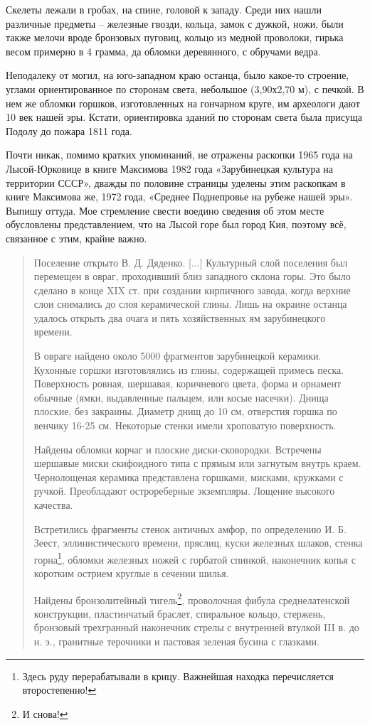 Скелеты лежали в гробах, на спине, головой к западу. Среди них нашли различные предметы – железные гвозди, кольца, замок с дужкой, ножи, были также мелочи вроде бронзовых пуговиц, кольцо из медной проволоки, гирька весом примерно в 4 грамма, да обломки деревянного, с обручами ведра. 

Неподалеку от могил, на юго-западном краю останца, было какое-то строение, углами ориентированное по сторонам света, небольшое (3,90х2,70 м), с печкой. В нем же обломки горшков, изготовленных на гончарном круге, им археологи дают 10 век нашей эры. Кстати, ориентировка зданий по сторонам света была присуща Подолу до пожара 1811 года.

Почти никак, помимо кратких упоминаний, не отражены раскопки 1965 года на Лысой-Юрковице в книге Максимова 1982 года «Зарубинецкая культура на территории СССР», дважды по половине страницы уделены этим раскопкам в книге Максимова же, 1972 года, «Среднее Поднепровье на рубеже нашей эры». Выпишу оттуда. Мое стремление свести воедино сведения об этом месте обусловлены представлением, что на Лысой горе был город Кия, поэтому всё, связанное с этим, крайне важно.

\begin{quotation}
Поселение открыто В. Д. Дяденко. [...] Культурный слой поселения был перемещен в овраг, проходивший близ западного склона горы. Это было сделано в конце XIX ст. при создании кирпичного завода, когда верхние слои снимались до слоя керамической глины. Лишь на окраине останца удалось открыть два очага и пять хозяйственных ям зарубинецкого времени. 

В овраге найдено около 5000 фрагментов зарубинецкой керамики. Кухонные горшки изготовлялись из глины, содержащей примесь песка. Поверхность ровная, шершавая, коричневого цвета, форма и орнамент обычные (ямки, выдавленные пальцем, или косые насечки). Днища плоские, без закраины. Диаметр днищ до 10 см, отверстия горшка по венчику 16-25 см. Некоторые стенки имели хроповатую поверхность. 

Найдены обломки корчаг и плоские диски-сковородки. Встречены шершавые миски скифоидного типа с прямым или загнутым внутрь краем. Чернолощеная керамика представлена горшками, мисками, кружками с ручкой. Преобладают острореберные экземпляры. Лощение высокого качества. 

Встретились фрагменты стенок античных амфор, по определению И. Б. Зеест, эллинистического времени, пряслиц, куски железных шлаков, стенка горна\footnote{Здесь руду перерабатывали в крицу. Важнейшая находка перечисляется второстепенно!}, обломки железных ножей с горбатой спинкой, наконечник копья с коротким острием круглые в сечении шилья. 

Найдены бронзолитейный тигель\footnote{И снова!}, проволочная фибула среднелатенской конструкции, пластинчатый браслет, спиральное кольцо, стержень, бронзовый трехгранный наконечник стрелы с внутренней втулкой III в. до н. э., гранитные терочники и пастовая зеленая бусина с глазками.
\end{quotation}

